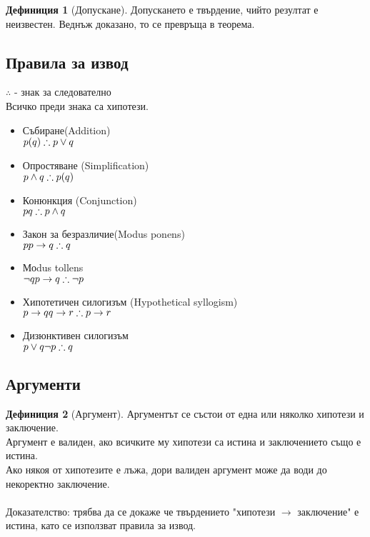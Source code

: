 \documentclass[fleqn, 12pt]{article}
\theoremstyle{definition}
\newtheorem{definition}{Дефиниция}[subsection]
\begin{document}
\begin{definition}[Допускане]
Допускането е твърдение, чийто резултат е неизвестен. Веднъж доказано, то се превръща в теорема. 
\end{definition}

\subsection{Правила за извод}
$\therefore$ - знак за следователно\\
Всичко преди знака са хипотези. 
\begin{itemize}
	\item Събиране(Addition) \\ $p (q) \\ \therefore p\lor q$
	\item Опростяване (Simplification) \\$p\land q \\ \therefore p(q)$
	\item Конюнкция (Conjunction) \\$p \\ q\\ \therefore p\land q$
	\item Закон за безразличие(Modus ponens) \\ $p \\ p \to q \\ \therefore q$
	\item Моdus tollens \\$\neg q \\ p \to q \\ \therefore \neg p$
	\item Хипотетичен силогизъм (Hypothetical syllogism) \\$ p \to q \\ q \to r \\ \therefore p \to r $
	\item Дизюнктивен силогизъм \\ $p\lor q \\ \neg p \\ \therefore q$
\end{itemize}

\subsection{Аргументи}

\begin{definition}[Аргумент]
Аргументът се състои от една или няколко хипотези и заключение. \\
Аргумент е валиден, ако всичките му хипотези са истина и заключението също е истина. \\
Ако някоя от хипотезите е лъжа, дори валиден аргумент може да води до некоректно заключение. \\
\\
Доказателство: трябва да се докаже че твърдението "хипотези $\to$ заключение" е истина, като се използват правила за извод. 
\end{definition}
\end{document}
